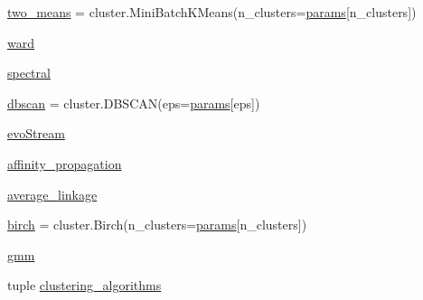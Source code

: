 \begin{DoxyCompactItemize}
\hyperlink{namespaceStreamClusteringAlgorithms_1_1evoStream_1_1v1_1_1Tests_1_1plot__cluster__comparison2_aa2bb78c2d2af1db2249aa24d2ae1129a}{two\+\_\+means} = cluster.\+Mini\+Batch\+K\+Means(n\+\_\+clusters=\hyperlink{namespaceStreamClusteringAlgorithms_1_1evoStream_1_1v1_1_1Tests_1_1plot__cluster__comparison2_a1449d875d082f7c913611e6412520189}{params}\mbox{[}\textquotesingle{}n\+\_\+clusters\textquotesingle{}\mbox{]})
\item 
\hyperlink{namespaceStreamClusteringAlgorithms_1_1evoStream_1_1v1_1_1Tests_1_1plot__cluster__comparison2_aaf8a7e37d59e9fadd9316e501f21fb52}{ward}
\item 
\hyperlink{namespaceStreamClusteringAlgorithms_1_1evoStream_1_1v1_1_1Tests_1_1plot__cluster__comparison2_a4061b25c7214a9f0784a943dbd4f4aa9}{spectral}
\item 
\hyperlink{namespaceStreamClusteringAlgorithms_1_1evoStream_1_1v1_1_1Tests_1_1plot__cluster__comparison2_a5c87476c1a74958b836b769bd6cfb58e}{dbscan} = cluster.\+D\+B\+S\+C\+AN(eps=\hyperlink{namespaceStreamClusteringAlgorithms_1_1evoStream_1_1v1_1_1Tests_1_1plot__cluster__comparison2_a1449d875d082f7c913611e6412520189}{params}\mbox{[}\textquotesingle{}eps\textquotesingle{}\mbox{]})
\item 
\hyperlink{namespaceStreamClusteringAlgorithms_1_1evoStream_1_1v1_1_1Tests_1_1plot__cluster__comparison2_a91bfdb55405dbaa40307584a1c00f2ad}{evo\+Stream}
\item 
\hyperlink{namespaceStreamClusteringAlgorithms_1_1evoStream_1_1v1_1_1Tests_1_1plot__cluster__comparison2_ad754aef230ed0200da57e69dda250948}{affinity\+\_\+propagation}
\item 
\hyperlink{namespaceStreamClusteringAlgorithms_1_1evoStream_1_1v1_1_1Tests_1_1plot__cluster__comparison2_a8caf4026b223dfdcd1fa786f235c80e9}{average\+\_\+linkage}
\item 
\hyperlink{namespaceStreamClusteringAlgorithms_1_1evoStream_1_1v1_1_1Tests_1_1plot__cluster__comparison2_a34ed9b927ae9917ef31f03606d71e1b8}{birch} = cluster.\+Birch(n\+\_\+clusters=\hyperlink{namespaceStreamClusteringAlgorithms_1_1evoStream_1_1v1_1_1Tests_1_1plot__cluster__comparison2_a1449d875d082f7c913611e6412520189}{params}\mbox{[}\textquotesingle{}n\+\_\+clusters\textquotesingle{}\mbox{]})
\item 
\hyperlink{namespaceStreamClusteringAlgorithms_1_1evoStream_1_1v1_1_1Tests_1_1plot__cluster__comparison2_a6000de2a41cdb0d7832045df82f70405}{gmm}
\item 
tuple \hyperlink{namespaceStreamClusteringAlgorithms_1_1evoStream_1_1v1_1_1Tests_1_1plot__cluster__comparison2_ab53f584f9e4719338b483c49a83db64a}{clustering\+\_\+algorithms}

\end{DoxyCompactItemize}
